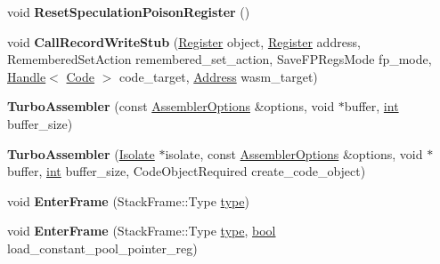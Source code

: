 \begin{DoxyCompactItemize}
void {\bfseries Reset\+Speculation\+Poison\+Register} ()
\item 
\mbox{\label{classv8_1_1internal_1_1TurboAssembler_a79a934c4dffec4c2148ff244228b99d3}} 
void {\bfseries Call\+Record\+Write\+Stub} (\mbox{\hyperlink{classv8_1_1internal_1_1Register}{Register}} object, \mbox{\hyperlink{classv8_1_1internal_1_1Register}{Register}} address, Remembered\+Set\+Action remembered\+\_\+set\+\_\+action, Save\+F\+P\+Regs\+Mode fp\+\_\+mode, \mbox{\hyperlink{classv8_1_1internal_1_1Handle}{Handle}}$<$ \mbox{\hyperlink{classv8_1_1internal_1_1Code}{Code}} $>$ code\+\_\+target, \mbox{\hyperlink{classuintptr__t}{Address}} wasm\+\_\+target)
\item 
\mbox{\label{classv8_1_1internal_1_1TurboAssembler_ac5a1cdee47961f289dbb095cc534ef95}} 
{\bfseries Turbo\+Assembler} (const \mbox{\hyperlink{structv8_1_1internal_1_1AssemblerOptions}{Assembler\+Options}} \&options, void $\ast$buffer, \mbox{\hyperlink{classint}{int}} buffer\+\_\+size)
\item 
\mbox{\label{classv8_1_1internal_1_1TurboAssembler_ac5d3c303e7abed78a6c1fe7f9834c045}} 
{\bfseries Turbo\+Assembler} (\mbox{\hyperlink{classv8_1_1internal_1_1Isolate}{Isolate}} $\ast$isolate, const \mbox{\hyperlink{structv8_1_1internal_1_1AssemblerOptions}{Assembler\+Options}} \&options, void $\ast$buffer, \mbox{\hyperlink{classint}{int}} buffer\+\_\+size, Code\+Object\+Required create\+\_\+code\+\_\+object)
\item 
\mbox{\label{classv8_1_1internal_1_1TurboAssembler_a4aea206c1c673c33c7ef241e8bca04ea}} 
void {\bfseries Enter\+Frame} (Stack\+Frame\+::\+Type \mbox{\hyperlink{classstd_1_1conditional_1_1type}{type}})
\item 
\mbox{\label{classv8_1_1internal_1_1TurboAssembler_af705c58e218094857590d07367afb65f}} 
void {\bfseries Enter\+Frame} (Stack\+Frame\+::\+Type \mbox{\hyperlink{classstd_1_1conditional_1_1type}{type}}, \mbox{\hyperlink{classbool}{bool}} load\+\_\+constant\+\_\+pool\+\_\+pointer\+\_\+reg)
\item 
\mbox{\label{classv8_1_1internal_1_1TurboAssembler_a6fcf697a920fa427114a1923f03da4d8}} 

\end{DoxyCompactItemize}
